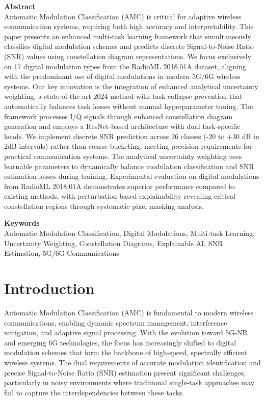 \documentclass{ELSP}
\begin{document}
\vspace{0.5em}
\noindent\textbf{\textcolor[RGB]{0,131,255}{Abstract}}\\
Automatic Modulation Classification (AMC) is critical for adaptive wireless communication systems, requiring both high accuracy and interpretability. This paper presents an enhanced multi‑task learning framework that simultaneously classifies digital modulation schemes and predicts discrete Signal‑to‑Noise Ratio (SNR) values using constellation diagram representations. We focus exclusively on 17 digital modulation types from the RadioML 2018.01A dataset, aligning with the predominant use of digital modulations in modern 5G/6G wireless systems. Our key innovation is the integration of enhanced analytical uncertainty weighting, a state‑of‑the‑art 2024 method with task collapse prevention that automatically balances task losses without manual hyperparameter tuning. The framework processes I/Q signals through enhanced constellation diagram generation and employs a ResNet‑based architecture with dual task‑specific heads. We implement discrete SNR prediction across 26 classes (-20 to +30 dB in 2dB intervals) rather than coarse bucketing, meeting precision requirements for practical communication systems. The analytical uncertainty weighting uses learnable parameters to dynamically balance modulation classification and SNR estimation losses during training. Experimental evaluation on digital modulations from RadioML 2018.01A demonstrates superior performance compared to existing methods, with perturbation‑based explainability revealing critical constellation regions through systematic pixel masking analysis.

\vspace{0.5em}
\noindent\textbf{\textcolor[RGB]{0,131,255}{Keywords}}\\
Automatic Modulation Classification, Digital Modulations, Multi‑task Learning, Uncertainty Weighting, Constellation Diagrams, Explainable AI, SNR Estimation, 5G/6G Communications

\section{Introduction}

Automatic Modulation Classification (AMC) \cite{thien2021survey} is fundamental to modern wireless communications, enabling dynamic spectrum management, interference mitigation, and adaptive signal processing. With the evolution toward 5G‑NR and emerging 6G technologies, the focus has increasingly shifted to digital modulation schemes that form the backbone of high‑speed, spectrally efficient wireless systems. The dual requirements of accurate modulation identification and precise Signal‑to‑Noise Ratio (SNR) estimation present significant challenges, particularly in noisy environments where traditional single‑task approaches may fail to capture the interdependencies between these tasks.
\end{document}
